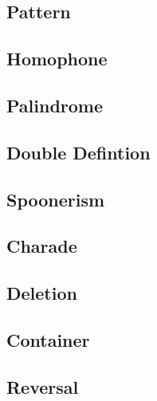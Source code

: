 \subsection{Pattern}

\subsection{Homophone}

\subsection{Palindrome}

\subsection{Double Defintion}

\subsection{Spoonerism}

\subsection{Charade}

\subsection{Deletion}

\subsection{Container}

\subsection{Reversal}
